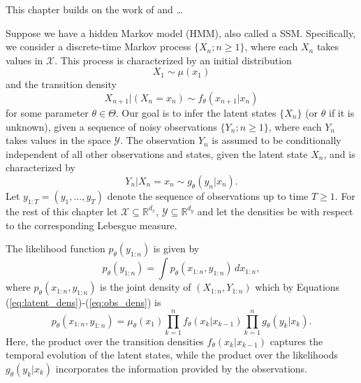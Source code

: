 This chapter builds on the work of \cite{Doucet} and \cite{DoucetEstParamSSM} \dots {}

Suppose we have a hidden Markov model (HMM), also called a \gls*{SSM}. Specifically, we consider a discrete-time Markov process $\{X_n; n\geq 1\}$, where each $X_n$ takes values in $\mathcal{X}$. This process is characterized by an initial distribution 
\[
X_1 \sim \mu(x_1)
\] 
and the transition density
\begin{equation}
	X_{n+1} \vert (X_n=x_n) \sim f_\theta(x_{n+1} \vert x_n) 
	\label{eq:latent_dens}
\end{equation}
for some parameter $\theta \in \Theta$. Our goal is to infer the latent states $\{X_n\}$ (or $\theta$ if it is unknown), given a sequence of noisy observations $\{Y_n; n\geq 1\}$, where each $Y_n$ takes values in the space $\mathcal{Y}$. The observation $Y_n$ is assumed to be conditionally independent of all other observations and states, given the latent state $X_n$, and is characterized by
\begin{equation}
	Y_n \vert X_n=x_n \sim g_\theta(y_n \vert x_n).
	\label{eq:obs_dens}
\end{equation}
Let $y_{1:T}=(y_1,\dots,y_T)$ denote the sequence of observations up to time $T\geq 1$. For the rest of this chapter let $\mathcal{X} \subseteq \mathbb{R}^{d_x}$, $\mathcal{Y} \subseteq \mathbb{R}^{d_y}$ and let the densities be with respect to the corresponding Lebesgue measure. 

The likelihood function $p_\theta(y_{1:n})$ is given by
\[
p_\theta(y_{1:n})=\int p_\theta(x_{1:n}, y_{1:n}) \, dx_{1:n},
\]
where $p_\theta(x_{1:n}, y_{1:n})$ is the joint density of $(X_{1:n}, Y_{1:n})$ which by Equations (\ref{eq:latent_dens})-(\ref{eq:obs_dens}) is
\[
p_\theta(x_{1:n}, y_{1:n})=\mu_\theta(x_1) \prod_{k=1}^{n} f_\theta(x_k \vert x_{k-1})\prod_{k=1}^{n} g_\theta(y_k\vert x_k).
\]
Here, the product over the transition densities \( f_\theta(x_k\vert x_{k-1}) \) captures the temporal evolution of the latent states, while the product over the likelihoods \( g_\theta(y_k \vert x_k) \) incorporates the information provided by the observations.

